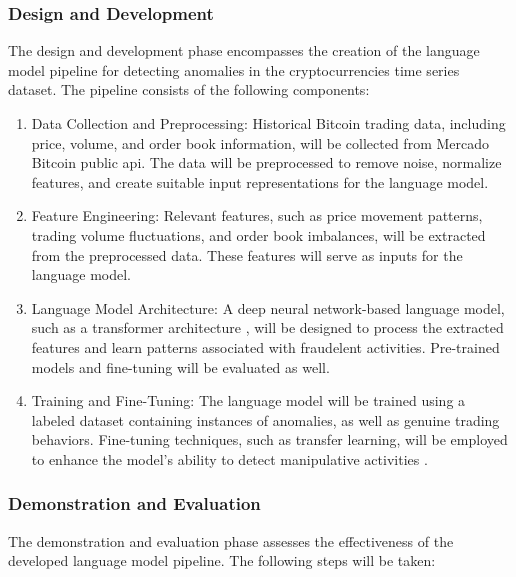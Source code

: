 \subsubsection{Design and Development}
The design and development phase encompasses the creation of the language model pipeline for detecting anomalies in the
cryptocurrencies time series dataset. The pipeline consists of the following components:

\begin{enumerate}
    \item Data Collection and Preprocessing: Historical Bitcoin trading data, including price, volume, and order book
    information, will be collected from Mercado Bitcoin public api. The data will be preprocessed to remove noise,
    normalize features, and create suitable input representations for the language model.
    \item Feature Engineering: Relevant features, such as price movement patterns, trading volume fluctuations, and
    order book imbalances, will be extracted from the preprocessed data. These features will serve as inputs for the
    language model.
    \item Language Model Architecture: A deep neural network-based language model, such as a transformer architecture
    \cite{vaswani2017attention}, will be designed to process the extracted features and learn patterns associated with
    fraudelent activities. Pre-trained models and fine-tuning will be evaluated as well.
    \item Training and Fine-Tuning: The language model will be trained using a labeled dataset containing instances of
    anomalies, as well as genuine trading behaviors. Fine-tuning techniques, such as transfer learning, will be employed
    to enhance the model's ability to detect manipulative activities \cite{howard2018universal}.
\end{enumerate}

\subsubsection{Demonstration and Evaluation}
The demonstration and evaluation phase assesses the effectiveness of the developed language model pipeline. The
following steps will be taken:

